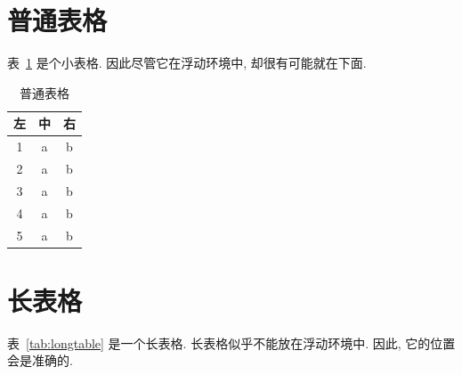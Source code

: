 \section{普通表格}

表~\ref{tab:test} 是个小表格. 因此尽管它在浮动环境中, 却很有可能就在下面.

\begin{table}[!htb]
  \caption{普通表格}
  \label{tab:test}
  \centering
  \begin{tabular}{ccc}
    \toprule
    左 & 中 & 右\\
    \midrule
    1  & a  & b\\
    2  & a  & b\\
    3  & a  & b\\
    4  & a  & b\\
    5  & a  & b\\
    \bottomrule
  \end{tabular}
\end{table}

\section{长表格}

表~\ref{tab:longtable} 是一个长表格. 长表格似乎不能放在浮动环境中. 因此, 它的位置会是准确的.

